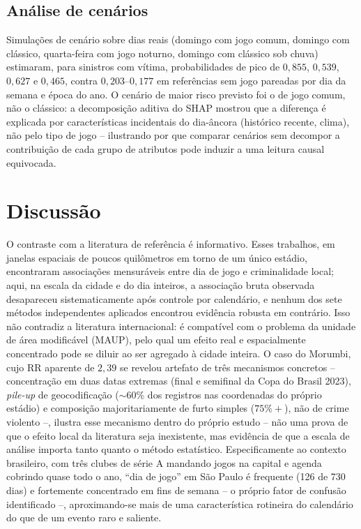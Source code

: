 \documentclass[12pt]{article}
\begin{document}
\subsection{Análise de cenários}

Simulações de cenário sobre dias reais (domingo com jogo comum, domingo
com clássico, quarta-feira com jogo noturno, domingo com clássico sob
chuva) estimaram, para sinistros com vítima, probabilidades de pico de
$0,855$, $0,539$, $0,627$ e $0,465$, contra $0,203$--$0,177$ em referências
sem jogo pareadas por dia da semana e época do ano. O cenário de maior
risco previsto foi o de jogo comum, não o clássico: a decomposição
aditiva do SHAP mostrou que a diferença é explicada por características
incidentais do dia-âncora (histórico recente, clima), não pelo tipo de
jogo -- ilustrando por que comparar cenários sem decompor a contribuição
de cada grupo de atributos pode induzir a uma leitura causal equivocada.

\section{Discussão}

O contraste com a literatura de referência
\cite{kurland2014,ristea2018,ristea2020} é informativo. Esses trabalhos,
em janelas espaciais de poucos quilômetros em torno de um único estádio,
encontraram associações mensuráveis entre dia de jogo e criminalidade
local; aqui, na escala da cidade e do dia inteiros, a associação bruta
observada desapareceu sistematicamente após controle por calendário, e
nenhum dos sete métodos independentes aplicados encontrou evidência
robusta em contrário. Isso não contradiz a literatura internacional: é
compatível com o problema da unidade de área modificável (MAUP), pelo qual
um efeito real e espacialmente concentrado pode se diluir ao ser agregado
à cidade inteira. O caso do Morumbi, cujo RR aparente de $2,39$ se revelou
artefato de três mecanismos concretos -- concentração em duas datas
extremas (final e semifinal da Copa do Brasil 2023), \emph{pile-up} de
geocodificação ($\sim$60\% dos registros nas coordenadas do próprio
estádio) e composição majoritariamente de furto simples ($75\%+$), não de
crime violento --, ilustra esse mecanismo dentro do próprio estudo -- não
uma prova de que o efeito local da literatura seja inexistente, mas
evidência de que a escala de análise importa tanto quanto o método
estatístico. Especificamente ao contexto
brasileiro, com três clubes de série A mandando jogos na capital e agenda
cobrindo quase todo o ano, ``dia de jogo'' em São Paulo é frequente (126
de 730 dias) e fortemente concentrado em fins de semana -- o próprio fator
de confusão identificado --, aproximando-se mais de uma característica
rotineira do calendário do que de um evento raro e saliente.
\end{document}
